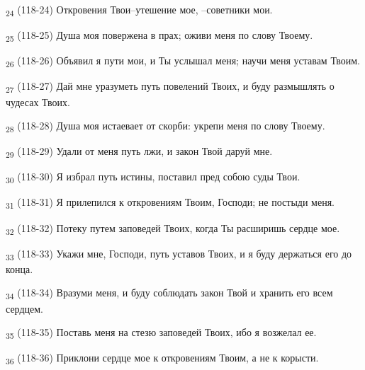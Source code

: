 \begin{tcolorbox}
\textsubscript{24} (118-24) Откровения Твои--утешение мое, --советники мои.
\end{tcolorbox}
\begin{tcolorbox}
\textsubscript{25} (118-25) Душа моя повержена в прах; оживи меня по слову Твоему.
\end{tcolorbox}
\begin{tcolorbox}
\textsubscript{26} (118-26) Объявил я пути мои, и Ты услышал меня; научи меня уставам Твоим.
\end{tcolorbox}
\begin{tcolorbox}
\textsubscript{27} (118-27) Дай мне уразуметь путь повелений Твоих, и буду размышлять о чудесах Твоих.
\end{tcolorbox}
\begin{tcolorbox}
\textsubscript{28} (118-28) Душа моя истаевает от скорби: укрепи меня по слову Твоему.
\end{tcolorbox}
\begin{tcolorbox}
\textsubscript{29} (118-29) Удали от меня путь лжи, и закон Твой даруй мне.
\end{tcolorbox}
\begin{tcolorbox}
\textsubscript{30} (118-30) Я избрал путь истины, поставил пред собою суды Твои.
\end{tcolorbox}
\begin{tcolorbox}
\textsubscript{31} (118-31) Я прилепился к откровениям Твоим, Господи; не постыди меня.
\end{tcolorbox}
\begin{tcolorbox}
\textsubscript{32} (118-32) Потеку путем заповедей Твоих, когда Ты расширишь сердце мое.
\end{tcolorbox}
\begin{tcolorbox}
\textsubscript{33} (118-33) Укажи мне, Господи, путь уставов Твоих, и я буду держаться его до конца.
\end{tcolorbox}
\begin{tcolorbox}
\textsubscript{34} (118-34) Вразуми меня, и буду соблюдать закон Твой и хранить его всем сердцем.
\end{tcolorbox}
\begin{tcolorbox}
\textsubscript{35} (118-35) Поставь меня на стезю заповедей Твоих, ибо я возжелал ее.
\end{tcolorbox}
\begin{tcolorbox}
\textsubscript{36} (118-36) Приклони сердце мое к откровениям Твоим, а не к корысти.
\end{tcolorbox}
